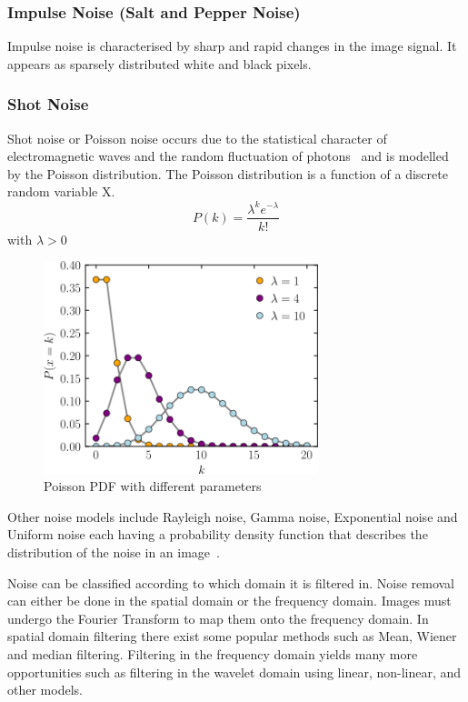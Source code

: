 \documentclass[a4paper, 12pt]{report}
\begin{document}
\subsubsection{Impulse Noise (Salt and Pepper Noise)}
Impulse noise is characterised by sharp and rapid changes in the image signal. It appears as sparsely distributed white and black pixels.

\subsubsection{Shot Noise}
Shot noise or Poisson noise occurs due to the statistical character of electromagnetic waves and the random fluctuation of photons~\cite{boyat2015review} and is modelled by the Poisson distribution. The Poisson distribution is a function of a discrete random variable X.
\[P(k)=\frac{\lambda^{k}e^{-\lambda}}{k!}\]
with \(\lambda > 0\)
\begin{figure}[ht]
    \centering
    \includegraphics[width=8cm]{poisson distribution.png}
    \caption{Poisson PDF with different parameters~\cite{poisson_image}}
    \label{fig:poisson_image}
\end{figure}

Other noise models include Rayleigh noise, Gamma noise, Exponential noise and Uniform noise each having a probability density function that describes the distribution of the noise in an image~\cite{gonzalez_woods_pearson_hall}.\par

Noise can be classified according to which domain it is filtered in. Noise removal can either be done in the spatial domain or the frequency domain. Images must undergo the Fourier Transform to map them onto the frequency domain. In spatial domain filtering there exist some popular methods such as Mean, Wiener and median filtering. Filtering in the frequency domain yields many more opportunities such as filtering in the wavelet domain using linear, non-linear, and other models.
\end{document}
